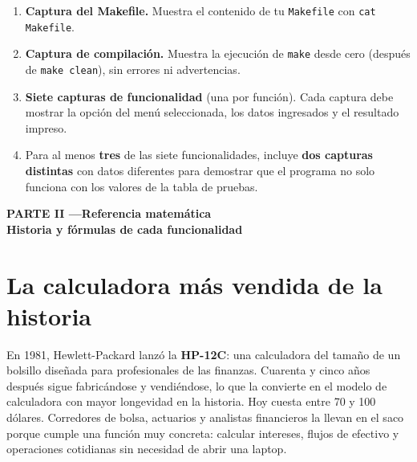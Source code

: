 \documentclass[12pt, oneside]{article}
\begin{document}
\begin{enumerate}
  \item \textbf{Captura del Makefile.}
        Muestra el contenido de tu \texttt{Makefile}
        con \texttt{cat Makefile}.
  \item \textbf{Captura de compilación.}
        Muestra la ejecución de \texttt{make} desde cero
        (después de \texttt{make clean}), sin errores ni advertencias.
  \item \textbf{Siete capturas de funcionalidad} (una por función).
        Cada captura debe mostrar la opción del menú seleccionada,
        los datos ingresados y el resultado impreso.
  \item Para al menos \textbf{tres} de las siete funcionalidades,
        incluye \textbf{dos capturas distintas} con datos diferentes
        para demostrar que el programa no solo funciona con los
        valores de la tabla de pruebas.
\end{enumerate}

\newpage
\begin{center}
  \Large\bfseries\color{dummies@black}
  PARTE II \enspace—\enspace Referencia matemática
  \vspace{4pt}\\
  \normalsize\mdseries\color{dummies@gray}
  Historia y fórmulas de cada funcionalidad
\end{center}
\vspace{1em}

\section{La calculadora más vendida de la historia}

En 1981, Hewlett-Packard lanzó la \textbf{HP-12C}: una calculadora del
tamaño de un bolsillo diseñada para profesionales de las finanzas.
Cuarenta y cinco años después sigue fabricándose y vendiéndose, lo que la
convierte en el modelo de calculadora con mayor longevidad en la historia.
Hoy cuesta entre 70 y 100 dólares.  Corredores de bolsa, actuarios y
analistas financieros la llevan en el saco porque cumple una función muy
concreta: calcular intereses, flujos de efectivo y operaciones cotidianas
sin necesidad de abrir una laptop.
\end{document}
